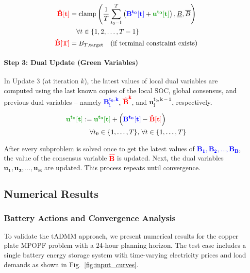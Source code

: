 \begin{align}
\textcolor{red}{\mathbf{\hat{B}[t]}} &= \text{clamp}\left( \frac{1}{T} \sum_{t_0=1}^{T} \left( \textcolor{blue}{\mathbf{B^{t_0}[t]}} + \textcolor{green!60!black}{\mathbf{u^{t_0}[t]}} \right), \underline{B}, \overline{B} \right) \\
&\quad \forall t \in \{1, 2, \ldots, T-1\} \\
\textcolor{red}{\mathbf{\hat{B}[T]}} &= B_{T,\text{target}} \quad \text{(if terminal constraint exists)}
\end{align}

\paragraph{Step 3: Dual Update (Green Variables)}

In Update 3 (at iteration $k$), the latest values of local dual variables are computed using the last known copies of the local SOC, global consensus, and previous dual variables -- namely \textcolor{blue}{$\mathbf{B_i^{t_0, k}}$}, \textcolor{red}{$\mathbf{\hat{B}^k}$}, and \textcolor{green!60!black}{$\mathbf{u_i^{t_0, k-1}}$}, respectively.

\begin{align}
\textcolor{green!60!black}{\mathbf{u^{t_0}[t]}} &:= \textcolor{green!60!black}{\mathbf{u^{t_0}[t]}} + \left( \textcolor{blue}{\mathbf{B^{t_0}[t]}} - \textcolor{red}{\mathbf{\hat{B}[t]}} \right) \\
&\quad \forall t_0 \in \{1, \ldots, T\}, \, \forall t \in \{1, \ldots, T\}
\end{align}

After every subproblem is solved once to get the latest values of \textcolor{blue}{$\mathbf{B_1, B_2, \ldots, B_B}$}, the value of the consensus variable \textcolor{red}{$\mathbf{\hat{B}}$} is updated. Next, the dual variables \textcolor{green!60!black}{$\mathbf{u_1, u_2, \ldots, u_B}$} are updated. This process repeats until convergence.

\subsection{Numerical Results}

\subsubsection{Battery Actions and Convergence Analysis}

To validate the tADMM approach, we present numerical results for the copper plate MPOPF problem with a 24-hour planning horizon. The test case includes a single battery energy storage system with time-varying electricity prices and load demands as shown in Fig.~\ref{fig:input_curves}.

